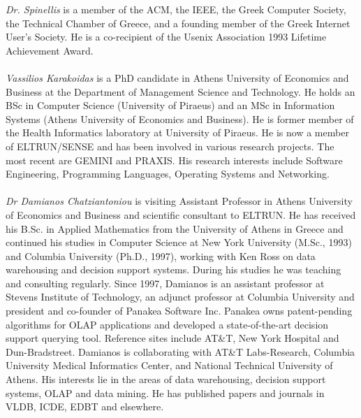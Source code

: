 \documentclass[10pt]{article}
\begin{document}
{\em Dr. Spinellis} is a member of the ACM, the IEEE, the Greek Computer Society, the Technical Chamber of Greece, and a founding member of the Greek 
Internet User's Society.  He is a co-recipient of the Usenix Association 1993 Lifetime Achievement Award.
\\
\\
{\em Vassilios Karakoidas} is a PhD candidate in Athens University of Economics and Business at the Department of Management Science and 
Technology. He holds an BSc in Computer Science (University of Piraeus) and an MSc in Information Systems (Athens University of 
Economics and Business). He is former member of the Health Informatics laboratory at University of Piraeus. He is now a member of 
ELTRUN/SENSE and has been involved in various research projects. The most recent are GEMINI and PRAXIS. His research interests include
Software Engineering, Programming Languages, Operating Systems and Networking.
\\
\\
{\em Dr Damianos Chatziantoniou} is visiting Assistant Professor in Athens University of Economics and Business and scientific consultant to 
ELTRUN. He has received his B.Sc. in Applied Mathematics from the University of Athens in Greece and continued his studies in Computer 
Science at New York University (M.Sc., 1993) and Columbia University (Ph.D., 1997), working with Ken Ross on data warehousing and decision
support systems. During his studies he was teaching and consulting regularly. Since 1997, Damianos is an assistant professor at Stevens 
Institute of Technology, an adjunct professor at Columbia University and president and co-founder of Panakea Software Inc. Panakea owns 
patent-pending algorithms for OLAP applications and developed a state-of-the-art decision support querying tool. Reference sites include AT\&T, 
New York Hospital and Dun-Bradstreet. Damianos is collaborating with AT\&T Labs-Research, Columbia University Medical Informatics Center, and 
National Technical University of Athens. His interests lie in the areas of data warehousing, decision support systems, OLAP and data mining. 
He has published papers and journals in VLDB, ICDE, EDBT and elsewhere.
\end{document}
